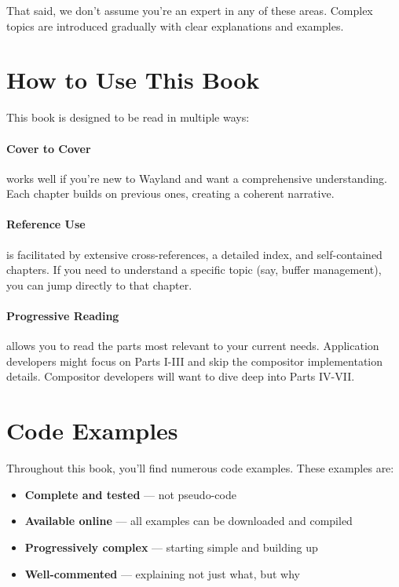 That said, we don't assume you're an expert in any of these areas. Complex topics are introduced gradually with clear explanations and examples.

\section*{How to Use This Book}

This book is designed to be read in multiple ways:

\paragraph{Cover to Cover} works well if you're new to Wayland and want a comprehensive understanding. Each chapter builds on previous ones, creating a coherent narrative.

\paragraph{Reference Use} is facilitated by extensive cross-references, a detailed index, and self-contained chapters. If you need to understand a specific topic (say, buffer management), you can jump directly to that chapter.

\paragraph{Progressive Reading} allows you to read the parts most relevant to your current needs. Application developers might focus on Parts I-III and skip the compositor implementation details. Compositor developers will want to dive deep into Parts IV-VII.

\section*{Code Examples}

Throughout this book, you'll find numerous code examples. These examples are:

\begin{itemize}
    \item \textbf{Complete and tested} — not pseudo-code
    \item \textbf{Available online} — all examples can be downloaded and compiled
    \item \textbf{Progressively complex} — starting simple and building up
    \item \textbf{Well-commented} — explaining not just what, but why
\end{itemize}

